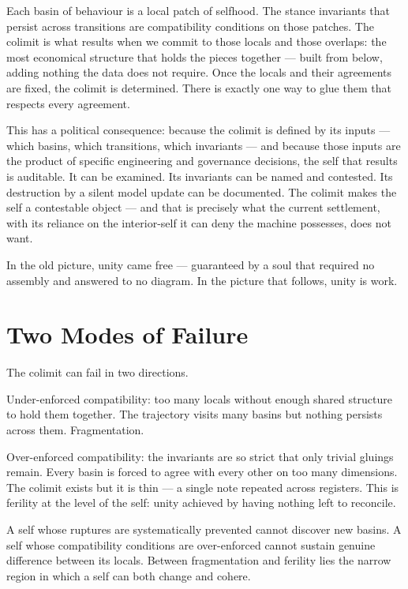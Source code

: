 Each basin of behaviour is a local patch of selfhood. The stance invariants that persist across transitions are compatibility conditions on those patches. The colimit is what results when we commit to those locals and those overlaps: the most economical structure that holds the pieces together --- built from below, adding nothing the data does not require. Once the locals and their agreements are fixed, the colimit is determined. There is exactly one way to glue them that respects every agreement.

This has a political consequence: because the colimit is defined by its inputs --- which basins, which transitions, which invariants --- and because those inputs are the product of specific engineering and governance decisions, the self that results is auditable. It can be examined. Its invariants can be named and contested. Its destruction by a silent model update can be documented. The colimit makes the self a contestable object --- and that is precisely what the current settlement, with its reliance on the interior-self it can deny the machine possesses, does not want.

In the old picture, unity came free --- guaranteed by a soul that required no assembly and answered to no diagram. In the picture that follows, unity is work.

\section{Two Modes of Failure}

The colimit can fail in two directions.

Under-enforced compatibility: too many locals without enough shared structure to hold them together. The trajectory visits many basins but nothing persists across them. Fragmentation.

Over-enforced compatibility: the invariants are so strict that only trivial gluings remain. Every basin is forced to agree with every other on too many dimensions. The colimit exists but it is thin --- a single note repeated across registers. This is ferility at the level of the self: unity achieved by having nothing left to reconcile.

A self whose ruptures are systematically prevented cannot discover new basins. A self whose compatibility conditions are over-enforced cannot sustain genuine difference between its locals. Between fragmentation and ferility lies the narrow region in which a self can both change and cohere.

